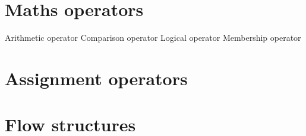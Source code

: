 %
%        
%        
%        
%        
%







\newpage
\section{Maths operators}
Arithmetic operator 
Comparison operator 
Logical operator 
Membership operator 

\section{Assignment operators}


\section{Flow structures}

